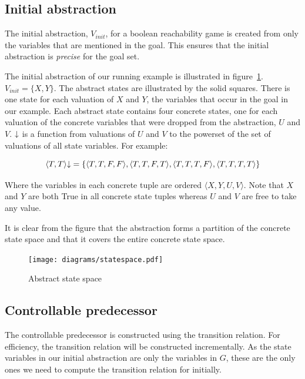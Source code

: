 \subsection{Initial abstraction}

The initial abstraction, $V_{init}$, for a boolean reachability game is created from only the variables that are mentioned in the goal. This ensures that the initial abstraction is \emph{precise} for the goal set.

The initial abstraction of our running example is illustrated in figure~\ref{fig:abs_state_sp}. $V_{init} = \{X, Y\}$. The abstract states are illustrated by the solid squares. There is one state for each valuation of $X$ and $Y$, the variables that occur in the goal in our example. Each abstract state contains four concrete states, one for each valuation of the concrete variables that were dropped from the abstraction, $U$ and $V$. $\mathord{\downarrow}$ is a function from valuations of $U$ and $V$ to the powerset of the set of valuations of all state variables. For example:

\begin{equation}
    \langle T, T \rangle\mathord{\downarrow} = \{ \langle T, T, F, F \rangle, \langle T, T, F, T \rangle, \langle T, T, T, F \rangle, \langle T, T, T, T \rangle \}
\end{equation}

Where the variables in each concrete tuple are ordered $\langle X, Y, U, V \rangle$. Note that $X$ and $Y$ are both True in all concrete state tuples whereas $U$ and $V$ are free to take any value.

It is clear from the figure that the abstraction forms a partition of the concrete state space and that it covers the entire concrete state space.

\begin{figure}[t]
\centering
\texttt{[image: diagrams/statespace.pdf]}
\caption{Abstract state space}
\label{fig:abs_state_sp}
\end{figure}

\subsection{Controllable predecessor}

The controllable predecessor is constructed using the transition relation. For efficiency, the transition relation will be constructed incrementally. As the state variables in our initial abstraction are only the variables in $G$, these are the only ones we need to compute the transition relation for initially.

